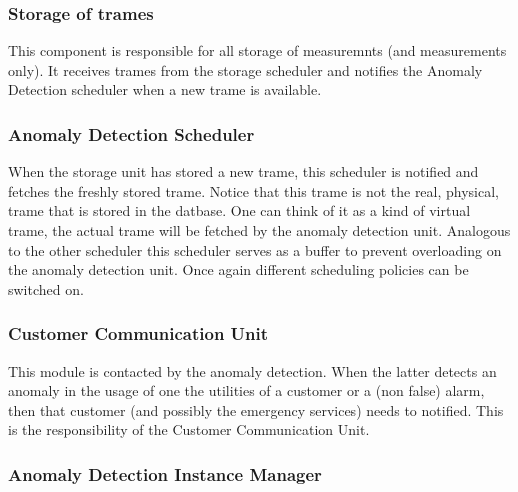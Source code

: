 
\subsubsection{Storage of trames}

\npar This component is responsible for all storage of measuremnts (and
measurements only). It receives trames from the storage scheduler and notifies
the Anomaly Detection scheduler when a new trame is available.

\subsubsection{Anomaly Detection Scheduler}

\npar When the storage unit has stored a new trame, this scheduler is notified
and fetches the freshly stored trame. Notice that this trame is not
the real, physical, trame that is stored in the datbase. One can think of it as
a kind of virtual trame, the actual trame will be fetched by the anomaly
detection unit. Analogous to the other scheduler this scheduler serves as a
buffer to prevent overloading on the anomaly detection unit. Once again
different scheduling policies can be switched on.

\subsubsection{Customer Communication Unit}

\npar This module is contacted by the anomaly detection. When the latter detects
an anomaly in the usage of one the utilities of a customer or a (non false)
alarm, then that customer (and possibly the emergency services) needs to
notified. This is the responsibility of the Customer Communication Unit.

\subsubsection{Anomaly Detection Instance Manager}

